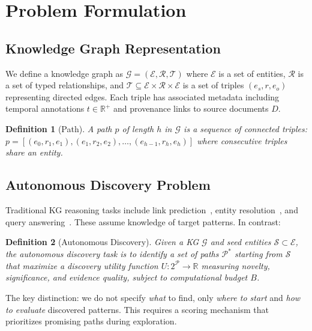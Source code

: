 \documentclass[10pt,twocolumn]{article}
\newtheorem{definition}{Definition}
\begin{document}
\section{Problem Formulation}
\label{sec:problem}

\subsection{Knowledge Graph Representation}

We define a knowledge graph as $\mathcal{G} = (\mathcal{E}, \mathcal{R}, \mathcal{T})$ where $\mathcal{E}$ is a set of entities, $\mathcal{R}$ is a set of typed relationships, and $\mathcal{T} \subseteq \mathcal{E} \times \mathcal{R} \times \mathcal{E}$ is a set of triples $(e_s, r, e_o)$ representing directed edges. Each triple has associated metadata including temporal annotations $t \in \mathbb{R}^+$ and provenance links to source documents $D$.

\begin{definition}[Path]
A path $p$ of length $h$ in $\mathcal{G}$ is a sequence of connected triples: $p = [(e_0, r_1, e_1), (e_1, r_2, e_2), \ldots, (e_{h-1}, r_h, e_h)]$ where consecutive triples share an entity.
\end{definition}

\subsection{Autonomous Discovery Problem}

Traditional KG reasoning tasks include link prediction~\cite{bordes2013translating}, entity resolution~\cite{shen2015entity}, and query answering~\cite{hamilton2018embedding}. These assume knowledge of target patterns. In contrast:

\begin{definition}[Autonomous Discovery]
Given a KG $\mathcal{G}$ and seed entities $\mathcal{S} \subset \mathcal{E}$, the autonomous discovery task is to identify a set of paths $\mathcal{P}^*$ starting from $\mathcal{S}$ that maximize a discovery utility function $U: 2^{\mathcal{P}} \rightarrow \mathbb{R}$ measuring novelty, significance, and evidence quality, subject to computational budget $B$.
\end{definition}

The key distinction: we do not specify \textit{what} to find, only \textit{where to start} and \textit{how to evaluate} discovered patterns. This requires a scoring mechanism that prioritizes promising paths during exploration.
\end{document}
